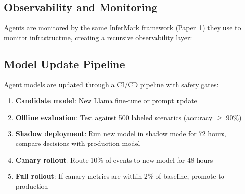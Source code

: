 \documentclass[conference,10pt,letterpaper]{IEEEtran}
\begin{document}
\subsection{Observability and Monitoring}

Agents are monitored by the same InferMark framework (Paper~1) they use to monitor infrastructure, creating a recursive observability layer:

\begin{table}[!t]
\caption{Agent-Level Metrics}
\label{tab:agent_metrics}
\centering\scriptsize
{}
\end{table}

\subsection{Model Update Pipeline}

Agent models are updated through a CI/CD pipeline with safety gates:

\begin{enumerate}
\item \textbf{Candidate model}: New Llama fine-tune or prompt update
\item \textbf{Offline evaluation}: Test against 500 labeled scenarios (accuracy $\geq$ 90\%)
\item \textbf{Shadow deployment}: Run new model in shadow mode for 72 hours, compare decisions with production model
\item \textbf{Canary rollout}: Route 10\% of events to new model for 48 hours
\item \textbf{Full rollout}: If canary metrics are within 2\% of baseline, promote to production
\end{enumerate}
\end{document}
